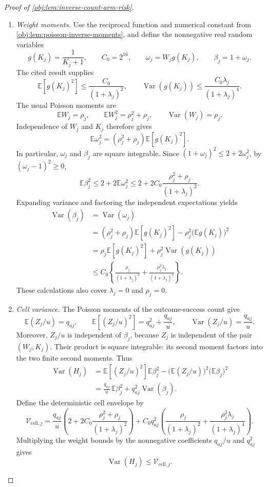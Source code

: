 \documentclass[11pt]{article}
\begin{document}
\begin{proof}[Proof of \cref{obj:lem:inverse-count-arm-risk}]
\begin{enumerate}
\item \emph{Weight moments.}
Use the reciprocal function and numerical constant from
\cref{obj:lem:poisson-inverse-moments}, and define the nonnegative real
random variables
\[
g(K_j)=\frac1{K_j+1},\qquad
C_0=2^{16},\qquad
\omega_j=W_jg(K_j),\qquad
\beta_j=1+\omega_j.
\]
The cited result supplies
\[
\mathbb E[g(K_j)^2]\le\frac{C_0}{(1+\lambda_j)^2},
\qquad
\operatorname{Var}(g(K_j))
\le\frac{C_0\lambda_j}{(1+\lambda_j)^4}.
\]
The usual Poisson moments are
\[
\mathbb E W_j=\rho_j,\qquad
\mathbb E W_j^2=\rho_j^2+\rho_j,\qquad
\operatorname{Var}(W_j)=\rho_j.
\]
Independence of \(W_j\) and \(K_j\) therefore gives
\[
\mathbb E\omega_j^2
=(\rho_j^2+\rho_j)\mathbb E[g(K_j)^2].
\]
In particular, \(\omega_j\) and \(\beta_j\) are square integrable. Since
\((1+\omega_j)^2\le2+2\omega_j^2\), by
\((\omega_j-1)^2\ge0\),
\[
\mathbb E\beta_j^2
\le2+2\mathbb E\omega_j^2
\le2+2C_0\frac{\rho_j^2+\rho_j}{(1+\lambda_j)^2}.
\]
Expanding variance and factoring the independent expectations yields
\[
\begin{aligned}
\operatorname{Var}(\beta_j)
&=\operatorname{Var}(\omega_j)\\
&=(\rho_j^2+\rho_j)\mathbb E[g(K_j)^2]
-\rho_j^2\bigl(\mathbb E g(K_j)\bigr)^2\\
&=\rho_j\mathbb E[g(K_j)^2]
+\rho_j^2\operatorname{Var}(g(K_j))\\
&\le C_0\left\{
\frac{\rho_j}{(1+\lambda_j)^2}
+\frac{\rho_j^2\lambda_j}{(1+\lambda_j)^4}
\right\}.
\end{aligned}
\]
These calculations also cover \(\lambda_j=0\) and \(\rho_j=0\).

\item \emph{Cell variance.}
The Poisson moments of the outcome-success count give
\[
\mathbb E(Z_j/u)=q_{aj},\qquad
\mathbb E[(Z_j/u)^2]=q_{aj}^2+\frac{q_{aj}}u,
\qquad
\operatorname{Var}(Z_j/u)=\frac{q_{aj}}u.
\]
Moreover, \(Z_j/u\) is independent of \(\beta_j\), because \(Z_j\) is
independent of the pair \((W_j,K_j)\). Their product is square integrable:
its second moment factors into the two finite second moments. Thus
\[
\begin{aligned}
\operatorname{Var}(H_j)
&=\mathbb E[(Z_j/u)^2]\mathbb E\beta_j^2
-\bigl(\mathbb E(Z_j/u)\bigr)^2
 \bigl(\mathbb E\beta_j\bigr)^2\\
&=\frac{q_{aj}}u\,\mathbb E\beta_j^2
+q_{aj}^2\operatorname{Var}(\beta_j).
\end{aligned}
\]
Define the deterministic cell envelope by
\[
\mathcal V_{\mathrm{cell},j}
=
\frac{q_{aj}}u\left(
2+2C_0\frac{\rho_j^2+\rho_j}{(1+\lambda_j)^2}
\right)
+C_0q_{aj}^2\left(
\frac{\rho_j}{(1+\lambda_j)^2}
+\frac{\rho_j^2\lambda_j}{(1+\lambda_j)^4}
\right).
\]
Multiplying the weight bounds by the nonnegative coefficients
\(q_{aj}/u\) and \(q_{aj}^2\) gives
\[
\operatorname{Var}(H_j)\le\mathcal V_{\mathrm{cell},j}.
\]


\end{enumerate}
\end{proof}
\end{document}
